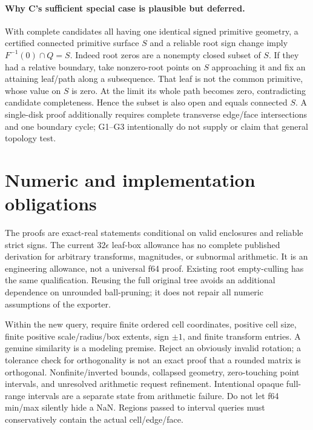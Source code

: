 \documentclass[11pt]{article}
\begin{document}
\paragraph{Why C's sufficient special case is plausible but deferred.}
With complete candidates all having one identical signed primitive geometry,
a certified connected primitive surface \(S\) and a reliable root sign change
imply \(F^{-1}(0)\cap Q=S\). Indeed root zeros are a nonempty closed subset
of \(S\). If they had a relative boundary, take nonzero-root points on \(S\)
approaching it and fix an attaining leaf/path along a subsequence. That leaf
is not the common primitive, whose value on \(S\) is zero. At the limit its
whole path becomes zero, contradicting candidate completeness. Hence the
subset is also open and equals connected \(S\). A single-disk proof additionally
requires complete transverse edge/face intersections and one boundary cycle;
G1--G3 intentionally do not supply or claim that general topology test.

\section{Numeric and implementation obligations}

The proofs are exact-real statements conditional on valid enclosures and
reliable strict signs. The current \(32\epsilon\) leaf-box allowance has no
complete published derivation for arbitrary transforms, magnitudes, or
subnormal arithmetic. It is an engineering allowance, not a universal f64
proof. Existing root empty-culling has the same qualification. Reusing the
full original tree avoids an additional dependence on unrounded ball-pruning;
it does not repair all numeric assumptions of the exporter.

Within the new query, require finite ordered cell coordinates, positive cell
size, finite positive scale/radius/box extents, sign \(\pm1\), and finite
transform entries. A genuine similarity is a modeling premise. Reject an
obviously invalid rotation; a tolerance check for orthogonality is not an exact
proof that a rounded matrix is orthogonal. Nonfinite/inverted bounds, collapsed
geometry, zero-touching point intervals, and unresolved arithmetic request
refinement. Intentional opaque full-range intervals are a separate state from
arithmetic failure. Do not let f64 min/max silently hide a NaN. Regions passed
to interval queries must conservatively contain the actual cell/edge/face.
\end{document}
